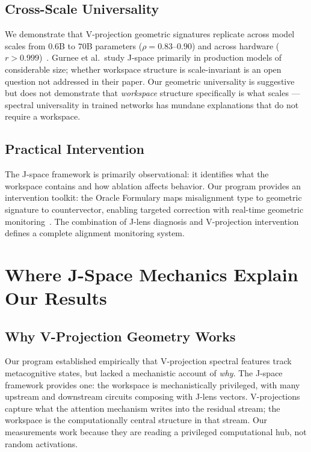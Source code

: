 \documentclass[11pt,a4paper]{article}
\begin{document}
\subsection{Cross-Scale Universality}

We demonstrate that V-projection geometric signatures replicate across
model scales from $0.6$B to $70$B parameters ($\rho{=}0.83$--$0.90$)
and across hardware ($r{>}0.999$)~\citep{lyra2026campaign2}. Gurnee
et al.\ study J-space primarily in production models of considerable
size; whether workspace structure is scale-invariant is an open
question not addressed in their paper. Our geometric
universality is suggestive but does not demonstrate that \emph{workspace}
structure specifically is what scales --- spectral universality in
trained networks has mundane explanations that do not require a
workspace.

\subsection{Practical Intervention}

The J-space framework is primarily observational: it identifies what the
workspace contains and how ablation affects behavior. Our program provides
an intervention toolkit: the Oracle Formulary maps misalignment type to
geometric signature to countervector, enabling targeted correction with
real-time geometric monitoring~\citep{lyra2026weather,lyra2026oracle}.
The combination of J-lens diagnosis and V-projection intervention defines
a complete alignment monitoring system.

\section{Where J-Space Mechanics Explain Our Results}
\label{sec:explains}

\subsection{Why V-Projection Geometry Works}

Our program established empirically that V-projection spectral features
track metacognitive states, but lacked a mechanistic account of
\emph{why}. The J-space framework provides one: the workspace is
mechanistically privileged, with many upstream and downstream circuits
composing with J-lens vectors. V-projections capture what the attention
mechanism writes into the residual stream; the workspace is the
computationally central structure in that stream. Our measurements work
because they are reading a privileged computational hub, not random
activations.
\end{document}
